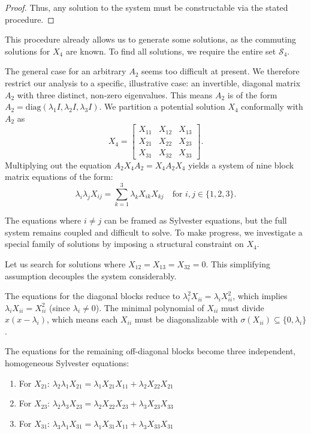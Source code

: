 \documentclass{article}
\begin{document}
\begin{proof}
  Thus, any solution to the system must be constructable via the stated procedure.
\end{proof}

This procedure already allows us to generate some solutions, as the commuting solutions for $X_4$ are known. To find all solutions, we require the entire set $\mathcal{S}_4$.

The general case for an arbitrary $A_2$ seems too difficult at present. We therefore restrict our analysis to a specific, illustrative case: an invertible, diagonal matrix $A_2$ with three distinct, non-zero eigenvalues. This means $A_2$ is of the form $A_2 = \text{diag}(\lambda_1 I, \lambda_2 I, \lambda_3 I)$. We partition a potential solution $X_4$ conformally with $A_2$ as 
\[
X_4 = 
\begin{bmatrix}
    X_{11} & X_{12} & X_{13} \\
    X_{21} & X_{22} & X_{23} \\
    X_{31} & X_{32} & X_{33}
\end{bmatrix}.
\]
Multiplying out the equation $A_2 X_4 A_2 = X_4 A_2 X_4$ yields a system of nine block matrix equations of the form:
\[
\lambda_i \lambda_j X_{ij} = \sum_{k = 1}^{3} \lambda_k X_{ik} X_{kj} \quad \text{for } i, j \in \{1, 2, 3\}.
\]

The equations where $i \neq j$ can be framed as Sylvester equations, but the full system remains coupled and difficult to solve. To make progress, we investigate a special family of solutions by imposing a structural constraint on $X_4$.


Let us search for solutions where $X_{12} = X_{13} = X_{32} = 0$. This simplifying assumption decouples the system considerably.

The equations for the diagonal blocks reduce to $\lambda_i^2 X_{ii} = \lambda_i X_{ii}^2$, which implies $\lambda_i X_{ii} = X_{ii}^2$ (since $\lambda_i \neq 0$). The minimal polynomial of $X_{ii}$ must divide $x(x-\lambda_i)$, which means each $X_{ii}$ must be diagonalizable with $\sigma(X_{ii}) \subseteq \{0, \lambda_i\}$.

The equations for the remaining off-diagonal blocks become three independent, homogeneous Sylvester equations:
\begin{enumerate}
    \item For $X_{21}$: $\lambda_2 \lambda_1 X_{21} = \lambda_1 X_{21} X_{11} + \lambda_2 X_{22} X_{21}$
    \item For $X_{23}$: $\lambda_2 \lambda_3 X_{23} = \lambda_2 X_{22} X_{23} + \lambda_3 X_{23} X_{33}$
    \item For $X_{31}$: $\lambda_3 \lambda_1 X_{31} = \lambda_1 X_{31} X_{11} + \lambda_3 X_{33} X_{31}$
\end{enumerate}
\end{document}

